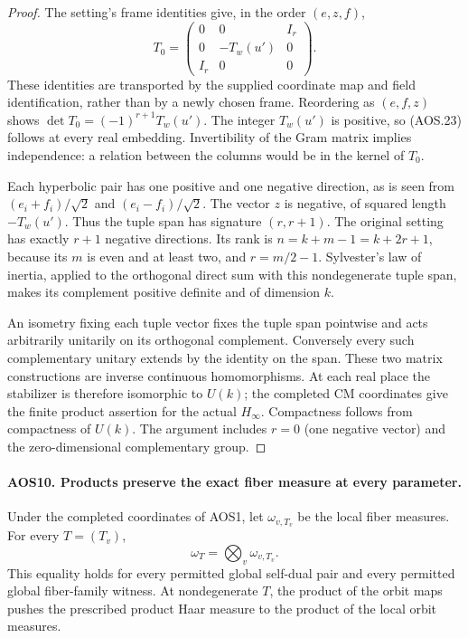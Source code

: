 \documentclass[11pt,a4paper]{article}
\numberwithin{equation}{section}
\theoremstyle{remark}\newtheorem{remark}[theorem]{Remark}
\begin{document}
\begin{proof}
The setting's frame identities give, in the order $(e,z,f)$,
\[
       T_0=\begin{pmatrix}
           0&0&I_r\\0&-T_w(u')&0\\I_r&0&0
          \end{pmatrix}.
 \tag{AOS.24}
\]
These identities are transported by the supplied coordinate map and
field identification, rather than by a newly chosen frame.
Reordering as $(e,f,z)$ shows
$\det T_0=(-1)^{r+1}T_w(u')$.  The integer $T_w(u')$ is positive,
so (AOS.23) follows at every real embedding.  Invertibility of the
Gram matrix implies independence: a relation between the columns
would be in the kernel of $T_0$.

Each hyperbolic pair has one positive and one negative direction,
as is seen from $(e_i+f_i)/\sqrt2$ and $(e_i-f_i)/\sqrt2$.
The vector $z$ is negative, of squared length $-T_w(u')$.
Thus the tuple span has signature $(r,r+1)$.  The original setting
has exactly $r+1$ negative directions.  Its rank is
$n=k+m-1=k+2r+1$, because its $m$ is even and at least two,
and $r=m/2-1$.  Sylvester's law of inertia, applied to the orthogonal
direct sum with this nondegenerate tuple span, makes its complement
positive definite and of dimension $k$.

An isometry fixing each tuple vector fixes the tuple span pointwise
and acts arbitrarily unitarily on its orthogonal complement.
Conversely every such complementary unitary extends by the identity
on the span.  These two matrix constructions are inverse continuous
homomorphisms.  At each real place the stabilizer is therefore
isomorphic to $U(k)$; the completed CM coordinates give the finite
product assertion for the actual $H_\infty$.  Compactness follows
from compactness of $U(k)$.  The argument includes $r=0$ (one
negative vector) and the zero-dimensional complementary group.
\end{proof}

\paragraph{AOS10. Products preserve the exact fiber measure at every parameter.}
\label{claim:AOS10}
Under the completed coordinates of AOS1, let $\omega_{v,T_v}$ be
the local fiber measures.  For every $T=(T_v)$,
\[
                         \omega_T=\bigotimes_v\omega_{v,T_v}.
 \tag{AOS.25}
\]
This equality holds for every permitted global self-dual pair and
every permitted global fiber-family witness.  At nondegenerate $T$,
the product of the orbit maps pushes the prescribed product Haar
measure to the product of the local orbit measures.
\end{document}
